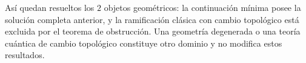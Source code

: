 Así quedan resueltos los \(2\) objetos geométricos: la continuación mínima
posee la solución completa anterior, y
la ramificación clásica con cambio topológico está excluida por el teorema de
obstrucción. Una geometría degenerada o una teoría cuántica de cambio
topológico constituye otro dominio y no modifica estos resultados.
